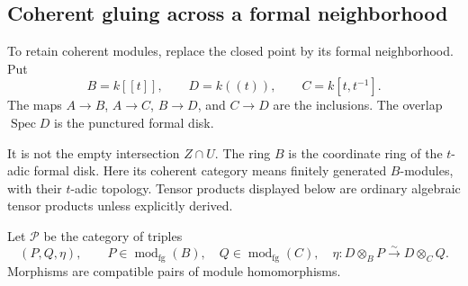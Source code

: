 \subsection{Coherent gluing across a formal neighborhood}

To retain coherent modules, replace the closed point by its formal
neighborhood. Put
\[
 B=k[[t]],\qquad D=k((t)),\qquad C=k[t,t^{-1}].
\]
The maps $A\to B$, $A\to C$, $B\to D$, and $C\to D$ are the
inclusions. The overlap $\operatorname{Spec}D$ is the punctured
formal disk.

It is not the empty intersection $Z\cap U$.
The ring $B$ is the coordinate ring of the $t$-adic formal disk.
Here its coherent category means finitely generated $B$-modules,
with their $t$-adic topology. Tensor products displayed below are
ordinary algebraic tensor products unless explicitly derived.

Let $\mathcal P$ be the category of triples
\[
 (P,Q,\eta),\qquad P\in\operatorname{mod}_{\mathrm{fg}}(B),\quad
 Q\in\operatorname{mod}_{\mathrm{fg}}(C),\quad
 \eta:D\otimes_B P\xrightarrow{\sim}D\otimes_C Q.
\]
Morphisms are compatible pairs of module homomorphisms.

